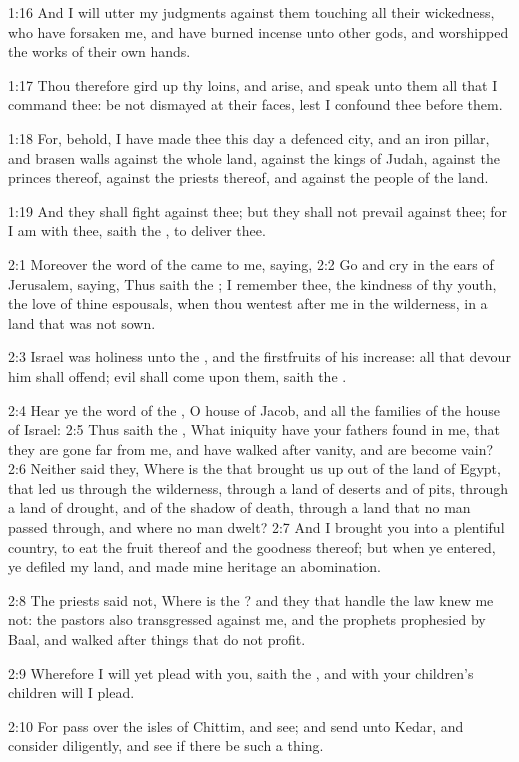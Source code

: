 1:16 And I will utter my judgments against them touching all their
wickedness, who have forsaken me, and have burned incense unto other
gods, and worshipped the works of their own hands.

1:17 Thou therefore gird up thy loins, and arise, and speak unto them
all that I command thee: be not dismayed at their faces, lest I
confound thee before them.

1:18 For, behold, I have made thee this day a defenced city, and an
iron pillar, and brasen walls against the whole land, against the
kings of Judah, against the princes thereof, against the priests
thereof, and against the people of the land.

1:19 And they shall fight against thee; but they shall not prevail
against thee; for I am with thee, saith the \LORD, to deliver thee.

2:1 Moreover the word of the \LORD came to me, saying, 2:2 Go and cry
in the ears of Jerusalem, saying, Thus saith the \LORD; I remember
thee, the kindness of thy youth, the love of thine espousals, when
thou wentest after me in the wilderness, in a land that was not sown.

2:3 Israel was holiness unto the \LORD, and the firstfruits of his
increase: all that devour him shall offend; evil shall come upon them,
saith the \LORD.

2:4 Hear ye the word of the \LORD, O house of Jacob, and all the
families of the house of Israel: 2:5 Thus saith the \LORD, What
iniquity have your fathers found in me, that they are gone far from
me, and have walked after vanity, and are become vain?  2:6 Neither
said they, Where is the \LORD that brought us up out of the land of
Egypt, that led us through the wilderness, through a land of deserts
and of pits, through a land of drought, and of the shadow of death,
through a land that no man passed through, and where no man dwelt?
2:7 And I brought you into a plentiful country, to eat the fruit
thereof and the goodness thereof; but when ye entered, ye defiled my
land, and made mine heritage an abomination.

2:8 The priests said not, Where is the \LORD? and they that handle the
law knew me not: the pastors also transgressed against me, and the
prophets prophesied by Baal, and walked after things that do not
profit.

2:9 Wherefore I will yet plead with you, saith the \LORD, and with your
children's children will I plead.

2:10 For pass over the isles of Chittim, and see; and send unto Kedar,
and consider diligently, and see if there be such a thing.

